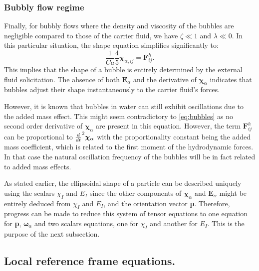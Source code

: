 \subsubsection{Bubbly flow regime}
Finally, for bubbly flows where the density and viscosity of the bubbles are negligible compared to those of the carrier fluid, we have $\zeta \ll 1$ and $\lambda \ll 0$. 
In this particular situation, the shape equation simplifies significantly to:
\begin{equation}
    \frac{1}{Ca}
    \frac{4  }{5} \bm\chi_{\alpha,ij}
    = \textbf{F}_{ij}^h. 
    \label{eq:bubbles}
\end{equation}
This implies that the shape of a bubble is entirely determined by the external fluid solicitation. 
The absence of both $\textbf{E}_\alpha$ and the derivative of $\bm\chi_\alpha$ indicates that bubbles adjust their shape instantaneously to the carrier fluid’s forces.

However, it is known that bubbles in water can still exhibit oscillations due to the added mass effect. 
This might seem contradictory to \ref{eq:bubbles} as no second order derivative of $\bm\chi_\alpha$ are present in this equation. 
However, the term $\textbf{F}_{ij}^h$ can be proportional to $\frac{d}{dt}^2 \bm\chi_\alpha$ with the proportionality constant being the added mass coefficient, which is related to the first moment of the hydrodynamic forces. 
In that case the natural oscillation frequency of the bubbles will be in fact related to added mass effects. 

As stated earlier, the ellipsoidal shape of a particle can be described uniquely using the scalars $\chi_I$ and $E_I$ since the other components of $\bm\chi_\alpha$ and $\textbf{E}_\alpha$ might be entirely deduced from $\chi_I$ and $E_I$, and the orientation vector \textbf{p}. 
Therefore, progress can be made to reduce this system of tensor equations to one equation for \textbf{p}, $\bm\omega_\alpha$ and two scalars equations, one for $\chi_I$ and another for $E_I$. 
This is the purpose of the next subsection. 


\subsection{Local reference frame equations.}

